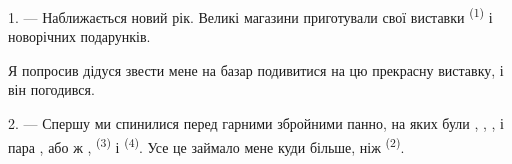 %
%

\VUsaut{4.0mm}
\VUsaut{2.0mm}
\VUsaut{3.4mm}

1. --- Наближається новий рік. Великі магазини приготували свої виставки
 \textsuperscript{(1)} і новорічних подарунків.

Я попросив дідуся звести мене на базар подивитися на цю прекрасну виставку, і він
погодився.

2. --- Спершу ми спинилися перед гарними збройними панно, на яких були
, , ,  і пара
, або ж ,  \textsuperscript{(3)} і
 \textsuperscript{(4)}. Усе це займало мене куди більше, ніж
 \textsuperscript{(2)}.

\VUsaut{3.0mm}
\VUsaut{2.6mm}

